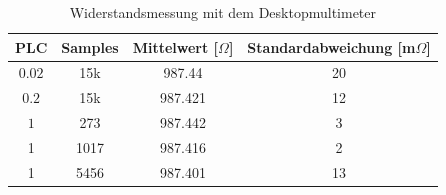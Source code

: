 \begin{table}[h]
	\centering
	\begin{tabular}{|c|c|c|c|}
	\hline 
	PLC & Samples & Mittelwert [$\Omega$] & Standardabweichung [m$\Omega$] \\ 
	\hline 
	$0.02$ & 15k & 987.44 & 20 \\ 
	\hline 
	$0.2$ & 15k & 987.421 & 12 \\ 
	\hline 
	$1$ & 273 & 987.442 & 3 \\ 
	\hline 
	1 & 1017 & 987.416 & 2 \\ 
	\hline 
	1 & 5456 & 987.401 & 13 \\ 
	\hline 
	\end{tabular}
	\caption{Widerstandsmessung mit dem Desktopmultimeter}
	\label{tb:widerstand_dm}
\end{table}

